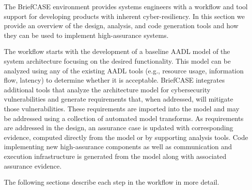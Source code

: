 

The BriefCASE environment provides systems engineers with a workflow and tool support for developing
products with inherent cyber-resiliency. 
In this section we provide an overview of the design, analysis, and code generation tools and how they can be used
to implement high-assurance systems.  

The  workflow starts with the development of a baseline AADL model of the system architecture
focusing on the desired functionality. This model can be analyzed using any of the existing AADL 
tools (e.g., resource usage, information flow, latency) to determine whether it is acceptable.
BriefCASE integrates additional tools that analyze the architecture model for cybersecurity vulnerabilities and
generate requirements that, when addressed, will mitigate those vulnerabilities.
These requirements are imported into the model and may be addressed using a 
collection of automated model transforms. As requirements are addressed in the design, an assurance case is updated with
corresponding evidence, computed directly from the model or by supporting analysis tools.  
Code implementing new high-assurance components as well as communication and execution infrastructure
is generated from the model along with associated assurance evidence.  

The following sections describe each step in the workflow in more detail. 

